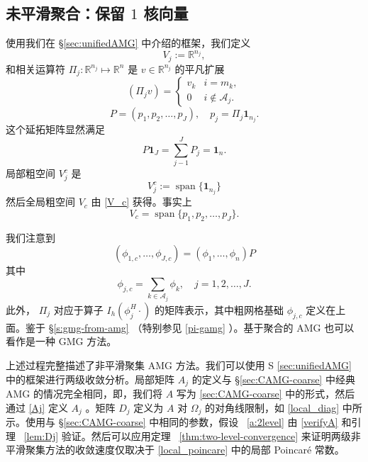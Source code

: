 \documentclass[12pt]{acta_2011xz}
\begin{document}
   \subsection{未平滑聚合：保留    $1$    核向量  }    使用我们在    \S       \ref{sec:unifiedAMG}    中介绍的框架，我们定义
   \begin{equation*}
    V_j:= \mathbb{R}^{n_j},
\end{equation*}    和相关运算符    $\Pi_j: \mathbb R^{n_j}\mapsto \mathbb
R^n$    是    $v\in \mathbb R^{n_j}$    的平凡扩展 
   \begin{equation}\label{UA_PI}
    (\Pi_jv)= \begin{cases}
        v_k & i=m_k, \\ 
        0 & i\notin \mathcal A_j.
    \end{cases}
\end{equation}    
   \begin{equation}
  \label{aggP0}
P=(p_1, p_2, \dots, p_J), \quad     p_j=\Pi_j\boldsymbol{1}_{n_j}.  
\end{equation}    这个延拓矩阵显然满足
   \begin{equation}
\label{aggP0-1}
P\boldsymbol 1_J=\sum_{j-1}^JP_j=\boldsymbol 1_n.   
\end{equation}    局部粗空间    $V_j^c$    是 
   \begin{equation*}
    V_j^c:=\operatorname{span} \{ \bm{1}_{n_j} \} 
\end{equation*}    然后全局粗空间    $V_c$    由    \eqref{V_c}    获得。事实上
   \begin{equation*}
    V_c=\operatorname{span} \{ p_1, p_2, \dots, p_J \} .
\end{equation*}     

我们注意到 
   \begin{equation}
(\phi_{1,c},\ldots,\phi_{J,c})=(\phi_1,\ldots,\phi_n)P
\end{equation}    其中
   \begin{equation}\label{AggBasis0}
    \phi_{j,c}=\sum_{k\in \mathcal A_j}\phi_k, \quad j=1, 2, \dots, J.
\end{equation}    此外，   $\Pi_j$    对应于算子    $I_h(\phi_j^H\cdot )$    的矩阵表示，其中粗网格基础    $\phi_{j,c}$    定义在上面。鉴于    \S       \ref{s:gmg-from-amg}   （特别参见
   \eqref{pi-gamg}    ）。基于聚合的 AMG 也可以看作是一种 GMG 方法。  

上述过程完整描述了非平滑聚集 AMG 方法。我们可以使用 S    \ref{sec:unifiedAMG}    中的框架进行两级收敛分析。局部矩阵    $A_j$    的定义与    \S       \ref{sec:CAMG-coarse}    中经典 AMG 的情况完全相同，即，我们将    $A$    写为    \eqref{sec:CAMG-coarse}    中的形式，然后通过    \eqref{Aj}    定义    $A_j$   。矩阵    $D_j$    定义为    $A$    对    $\Omega_j$    的对角线限制，如    \eqref{local_diag}    中所示。使用与
   \S       \ref{sec:CAMG-coarse}    中相同的参数，假设~    \ref{a:2level}    由
   \eqref{verifyA}    和引理~    \ref{lem:Dj}    验证。然后可以应用定理~    \ref{thm:two-level-convergence}    来证明两级非平滑聚集方法的收敛速度仅取决于
   \eqref{local_poincare}    中的局部 Poincar\'{e} 常数。  
\end{document}
